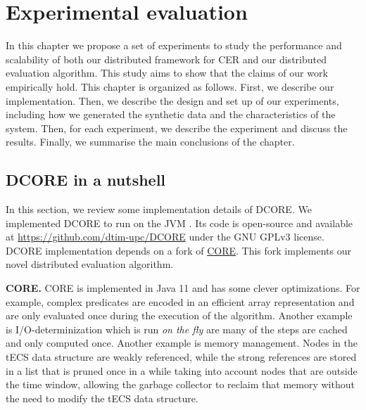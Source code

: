 \chapter{Experimental evaluation}\label{chapter:experimental_evaluation}

In this chapter we propose a set of experiments to study the performance and scalability of both our distributed framework for CER and our distributed evaluation algorithm. This study aims to show that the claims of our work empirically hold. This chapter is organized as follows. First, we describe our implementation. Then, we describe the design and set up of our experiments, including how we generated the synthetic data and the characteristics of the system. Then, for each experiment, we describe the experiment and discuss the results. Finally, we summarise the main conclusions of the chapter.

\section{DCORE in a nutshell}\label{chapter:dcore}

In this section, we review some implementation details of DCORE. We implemented DCORE to run on the JVM \cite{jvm}. Its code is open-source and available at \url{https://github.com/dtim-upc/DCORE} under the GNU GPLv3 license. DCORE implementation depends on a fork of \href{https://github.com/dtim-upc/CORE2/tree/distributed_enumeration}{CORE}. This fork implements our novel distributed evaluation algorithm.

\textbf{CORE.} CORE is implemented in Java 11 and has some clever optimizations. For example, complex predicates are encoded in an efficient array representation and are only evaluated once during the execution of the algorithm. Another example is I/O-determinization which is run \emph{on the fly} are many of the steps are cached and only computed once. Another example is memory management. Nodes in the tECS data structure are weakly referenced, while the strong references are stored in a list that is pruned once in a while taking into account nodes that are outside the time window, allowing the garbage collector to reclaim that memory without the need to modify the tECS data structure.

